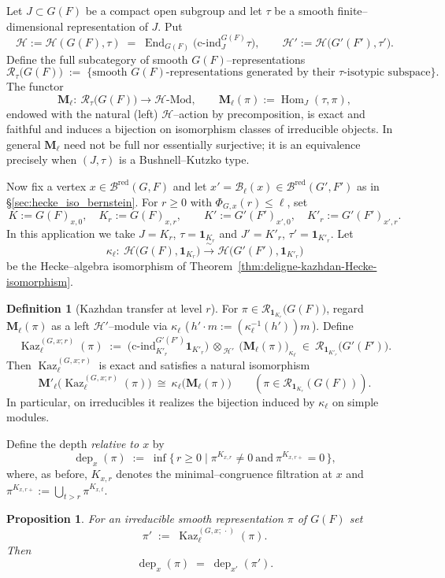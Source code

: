 \documentclass[american]{article}
\numberwithin{equation}{section}
\numberwithin{figure}{section}
\theoremstyle{plain}
\newtheorem{proposition}[theorem]{Proposition}
\theoremstyle{definition}
\newtheorem{definition}[theorem]{Definition}
\theoremstyle{remark}
\DeclareMathOperator{\Hom}{Hom}
\DeclareMathOperator{\dep}{dep}
\DeclareMathOperator{\End}{End}
\DeclareMathOperator{\Kaz}{Kaz}
\newcommand{\cH}{\mathcal{H}}
\newcommand{\cR}{\mathcal{R}}
\begin{document}
Let $J\subset G(F)$ be a compact open subgroup and let $\tau$ be a smooth finite--dimensional
representation of $J$. Put
\[
  \cH := \cH(G(F),\tau) \;=\; \End_{G(F)}\!\bigl(\mathrm{c\text{-}ind}_{J}^{G(F)} \tau\bigr),
  \qquad
  \cH' := \cH\bigl(G'(F'),\tau'\bigr).
\]
Define the full subcategory of smooth $G(F)$--representations
\[
  \cR_\tau\bigl(G(F)\bigr)
  \;:=\; \{\text{smooth } G(F)\text{-representations generated by their }\tau\text{-isotypic subspace}\}.
\]
The functor
\[
  \mathbf{M}_\ell:\ \cR_\tau\bigl(G(F)\bigr) \longrightarrow \cH\text{-}\mathrm{Mod},\qquad
  \mathbf{M}_\ell(\pi):=\Hom_{J}(\tau,\pi),
\]
endowed with the natural (left) $\cH$--action by precomposition, is exact and faithful and induces a
bijection on isomorphism classes of irreducible objects. In general $\mathbf{M}_\ell$ need not be
full nor essentially surjective; it is an equivalence precisely when $(J,\tau)$ is a Bushnell--Kutzko type.

\medskip
Now fix a vertex $x\in\mathcal{B}^{\mathrm{red}}(G,F)$ and let $x'=\mathcal{B}_\ell(x)\in\mathcal{B}^{\mathrm{red}}(G',F')$ as in
\S \ref{sec:hecke_iso_bernstein}. For $r\ge0$ with $\Phi_{G,x}(r)\le \ell$, set
\[
  K:=G(F)_{x,0},\quad K_r:=G(F)_{x,r}, \qquad
  K':=G'(F')_{x',0},\quad K'_r:=G'(F')_{x',r}.
\]
In this application we take $J=K_r$, $\tau=\mathbf{1}_{K_r}$ and $J'=K'_r$, $\tau'=\mathbf{1}_{K'_r}$.
Let
\[
  \kappa_\ell:\ \cH\bigl(G(F),\mathbf{1}_{K_r}\bigr)\xrightarrow{\ \sim\ } \cH\bigl(G'(F'),\mathbf{1}_{K'_r}\bigr)
\]
be the Hecke--algebra isomorphism of Theorem~\ref{thm:deligne-kazhdan-Hecke-isomorphism}.

\begin{definition}[Kazhdan transfer at level $r$]
\label{def:Kaz-transfer}
For $\pi\in\cR_{\mathbf{1}_{K_r}}\!\bigl(G(F)\bigr)$, regard $\mathbf{M}_\ell(\pi)$ as a left $\cH'$--module via $\kappa_\ell$
(\,$h'\!\cdot m := (\kappa_\ell^{-1}(h'))m$\,). Define
\[
  \Kaz_\ell^{(G,x;r)}(\pi)
  \;:=\;
  \bigl(\mathrm{c\text{-}ind}_{K'_r}^{G'(F')}\mathbf{1}_{K'_r}\bigr)\ \otimes_{\ \cH'}\ \bigl(\mathbf{M}_\ell(\pi)\bigr)_{\kappa_\ell}
  \ \in\ \cR_{\mathbf{1}_{K'_r}}\!\bigl(G'(F')\bigr).
\]
Then $\Kaz_\ell^{(G,x;r)}$ is exact and satisfies a natural isomorphism
\[
  \mathbf{M}'_\ell\bigl(\Kaz_\ell^{(G,x;r)}(\pi)\bigr)\ \cong\ \kappa_\ell\!\bigl(\mathbf{M}_\ell(\pi)\bigr)
  \qquad(\pi\in\cR_{\mathbf{1}_{K_r}}\!(G(F))).
\]
In particular, on irreducibles it realizes the bijection induced by $\kappa_\ell$ on simple
modules.
\end{definition}
Define the depth \emph{relative to $x$} by
\[
  \dep_{x}(\pi)\;:=\;\inf\{\, r\ge 0 \mid \pi^{K_{x,r}}\neq 0\ \text{and}\ \pi^{K_{x,r+}}=0\,\},
\]
where, as before, $K_{x,r}$ denotes the minimal--congruence filtration at $x$ and
$\pi^{K_{x,r+}}:=\bigcup_{t>r}\pi^{K_{x,t}}$.
\begin{proposition}
\label{prop:depth-preserved-Kaz}
For an irreducible smooth representation $\pi$ of $G(F)$ set
\[
  \pi' \;:=\; \Kaz^{(G,x;\,\cdot)}_{\ell}(\pi).
\]
Then
\[
   \dep_{x}(\pi)\;=\;\dep_{x'}(\pi').
\]
\end{proposition}
\end{document}
